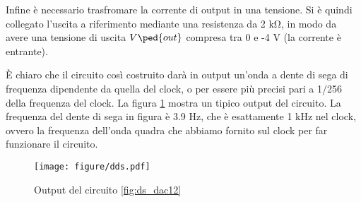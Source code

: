 Infine è necessario trasfromare la corrente di output in una tensione. Si è quindi collegato l'uscita a
riferimento mediante una resistenza da 2 \si{\kilo\ohm}, in modo da avere una tensione di uscita $V\ped{out}$
compresa tra 0 e -4 V (la corrente è entrante).

È chiaro che il circuito così costruito darà in output un'onda a dente di sega di frequenza dipendente da quella del clock,
o per essere più precisi pari a 1/256 della frequenza del clock. La figura \ref{fig:dds12} mostra un tipico output del circuito.
La frequenza del dente di sega in figura è 3.9 Hz, che è esattamente 1 kHz nel clock, ovvero la frequenza dell'onda quadra che abbiamo
fornito sul clock per far funzionare il circuito.

\begin{figure}
    \texttt{[image: figure/dds.pdf]}
    \caption{Output del circuito \ref{fig:ds_dac12}}
    \label{fig:dds12}
\end{figure}
